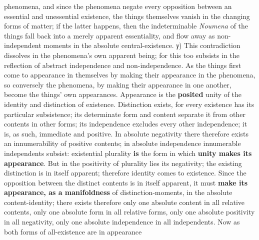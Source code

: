 \documentclass[12pt,a4paper,openany]{book}
\newcommand{\opage}[1]{\marginnote{\footnotesize\textit{[#1]}}}
\begin{document}
\opage{177}phenomena, and since the phenomena negate every opposition between an essential and unessential existence, the things themselves vanish in the changing forms of matter; if the latter happens, then the indeterminable \textit{Noumena} of the things fall back into a merely apparent essentiality, and flow away as non-independent moments in the absolute central-existence. \textit{γ}) This contradiction dissolves in the phenomena's own apparent being; for this too subsists in the reflection of abstract independence and non-independence. As the things first come to appearance in themselves by making their appearance in the phenomena, so conversely the phenomena, by making their appearance in one another, become the things' own appearances. Appearance is the \textbf{posited} unity of the identity and distinction of existence. Distinction exists, for every existence has its particular subsistence; its determinate form and content separate it from other contents in other forms; its independence excludes every other independence; it is, as such, immediate and positive. In absolute negativity there therefore exists an innumerability of positive contents; in absolute independence innumerable independents subsist: existential plurality \textbf{is} the form in which \textbf{unity makes its appearance}. But in the positivity of plurality lies its negativity; the existing distinction is in itself apparent; therefore identity comes to existence. Since the opposition between the distinct contents is in itself apparent, it must \textbf{make its appearance, as a manifoldness} of distinction-moments, in the absolute content-identity; there exists therefore only one absolute content in all relative contents, only one absolute form in all relative forms, only one absolute positivity in all negativity, only one absolute independence in all independents. Now as both forms of all-existence are in appearance
\setcounter{footnote}{0}%
\end{document}
